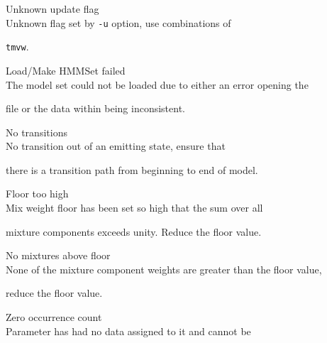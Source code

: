 \begin{itemize}
\begin{itemize}
\end{itemize}










\begin{itemize}


    Unknown update flag\\


        Unknown flag set by \texttt{-u} option, use combinations of 


        \texttt{tmvw}.





    Load/Make HMMSet failed\\


        The model set could not be loaded due to either an error opening the


        file or the data within being inconsistent.





    No transitions\\


        No transition out of an emitting state, ensure that


        there is a transition path from beginning to end of model.





    Floor too high\\


        Mix weight floor has been set so high that the sum over all 


        mixture components exceeds unity.  Reduce the floor value.





    No mixtures above floor\\


        None of the mixture component weights are greater than the floor value,


        reduce the floor value.





    Zero occurrence count\\


        Parameter has had no data assigned to it and cannot be



\end{itemize}
\end{itemize}
